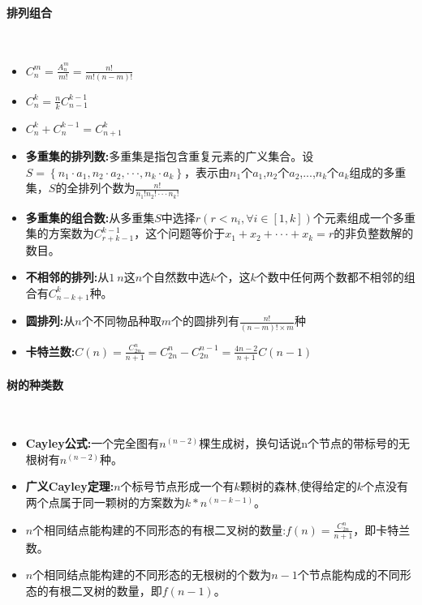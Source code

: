 \paragraph{排列组合}~{}
\\
\begin{itemize}
\item $C_{n}^{m}=\frac{A_{n}^{m}}{m!}=\frac{n!}{m!(n-m)!}$
\item $C_{n}^{k}=\frac{n}{k}C_{n-1}^{k-1}$
\item $C_{n}^{k}+C_{n}^{k-1}=C_{n+1}^{k}$
\item \textbf{多重集的排列数:}多重集是指包含重复元素的广义集合。设$S= \left\{ n_1 \cdot a_1,n_2 \cdot a_2, \cdot \cdot \cdot,n_k \cdot a_k \right\}$，表示由$n_1$个$a_1$,$n_2$个$a_2$,...,$n_k$个$a_k$组成的多重集，$S$的全排列个数为$\frac{n!}{n_1!n_2! \cdot \cdot \cdot n_k!}$
\item \textbf{多重集的组合数:}从多重集$S$中选择$r(r<n_i,\forall i \in [1, k])$个元素组成一个多重集的方案数为$C_{r+k-1}^{k-1}$，这个问题等价于$x_1+x_2+ \cdot \cdot \cdot +x_k=r$的非负整数解的数目。
\item \textbf{不相邻的排列:}从$1~n$这$n$个自然数中选$k$个，这$k$个数中任何两个数都不相邻的组合有$C_{n-k+1}^{k}$种。
\item \textbf{圆排列:}从$n$个不同物品种取$m$个的圆排列有$\frac{n!}{(n-m)! \times m}$种
\item \textbf{卡特兰数:}$C(n)=\frac{C_{2n}^{n}}{n+1}=C_{2n}^{n}-C_{2n}^{n-1}=\frac{4n-2}{n+1}C(n-1)$
\end{itemize}


\paragraph{树的种类数}~{}
\\
\begin{itemize}
\item \textbf{Cayley公式:}一个完全图有$n^{(n-2)}$棵生成树，换句话说n个节点的带标号的无根树有$n^{(n-2)}$种。
\item \textbf{广义Cayley定理:}$n$个标号节点形成一个有$k$颗树的森林,使得给定的$k$个点没有两个点属于同一颗树的方案数为$k*n^{(n−k−1)}$。
\item $n$个相同结点能构建的不同形态的有根二叉树的数量:$f(n)=\frac{C_{2n}^{n}}{n+1}$，即卡特兰数。
\item $n$个相同结点能构建的不同形态的无根树的个数为$n-1$个节点能构成的不同形态的有根二叉树的数量，即$f(n-1)$。
\end{itemize}